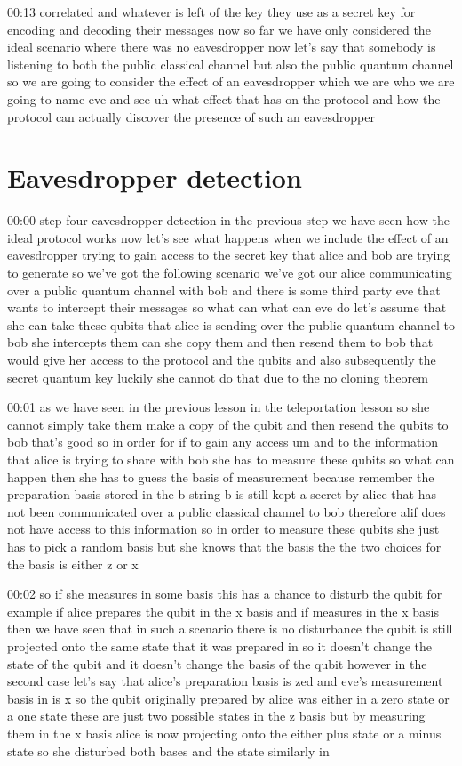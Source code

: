 00:13
correlated and whatever is left of the key they use as a secret key for
encoding and decoding their messages now so far we have only considered the
ideal scenario where there was no eavesdropper
now let's say that somebody is listening to both the public classical channel
but also the public quantum channel so we are going to consider the effect of an
eavesdropper which we are who we are going to name eve
and see uh what effect that has on the protocol and how the protocol can
actually discover the presence of such an eavesdropper


\section{Eavesdropper detection}


00:00
step four eavesdropper detection in the previous step we have seen how
the ideal protocol works now let's see what happens when we
include the effect of an eavesdropper trying to gain
access to the secret key that alice and bob are trying to generate
so we've got the following scenario we've got our alice communicating over a
public quantum channel with bob and there is some third party eve
that wants to intercept their messages so what can what can eve do
let's assume that she can take these qubits that alice is sending over the
public quantum channel to bob she intercepts them can she copy them
and then resend them to bob that would give her access to the protocol
and the qubits and also subsequently the secret quantum key
luckily she cannot do that due to the no cloning theorem

00:01
as we have seen in the previous lesson in the teleportation lesson so
she cannot simply take them make a copy of the qubit
and then resend the qubits to bob that's good so in order for if to gain
any access um and to the information that alice is trying to share with bob
she has to measure these qubits so what can happen then she has to guess
the basis of measurement because remember the
preparation basis stored in the b string b
is still kept a secret by alice that has not been communicated over a public
classical channel to bob therefore alif does not have access to this information
so in order to measure these qubits she just has to pick a random basis
but she knows that the basis the the two choices for the basis is either z or x

00:02
so if she measures in some basis this has a chance to disturb the qubit
for example if alice prepares the qubit in the x basis
and if measures in the x basis then we have seen that in such a scenario
there is no disturbance the qubit is still projected onto the same state that
it was prepared in so it doesn't change the state of the
qubit and it doesn't change the basis of the qubit
however in the second case let's say that alice's preparation basis is zed
and eve's measurement basis in is x so the qubit originally prepared by
alice was either in a zero state or a one state these are just two
possible states in the z basis but by measuring them in the x basis
alice is now projecting onto the either plus state
or a minus state so she disturbed both bases and the state similarly in

